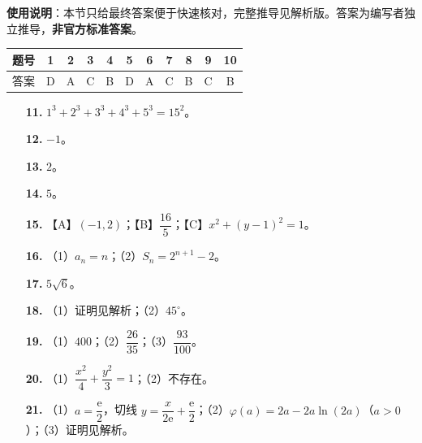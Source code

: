 
\begin{gknotice}
\textbf{使用说明}：本节只给最终答案便于快速核对，完整推导见解析版。答案为编写者独立推导，\textbf{非官方标准答案}。
\end{gknotice}

\begin{center}\begin{tabular}{ccccccccccc}
\toprule
题号 & 1 & 2 & 3 & 4 & 5 & 6 & 7 & 8 & 9 & 10 \\
\midrule
答案 & D & A & C & B & D & A & C & B & C & B \\
\bottomrule
\end{tabular}\end{center}

\begin{itemize}[leftmargin=2.6em]
  \item[\textbf{11.}] $1^3+2^3+3^3+4^3+5^3=15^2$。
  \item[\textbf{12.}] $-1$。
  \item[\textbf{13.}] $2$。
  \item[\textbf{14.}] $5$。
\end{itemize}

\begin{itemize}[leftmargin=2.6em]
  \item[\textbf{15.}] 【A】$(-1,2)$；【B】$\dfrac{16}{5}$；【C】$x^2+(y-1)^2=1$。
\end{itemize}

\begin{itemize}[leftmargin=2.6em]
  \item[\textbf{16.}] （1）$a_n=n$；（2）$S_n=2^{n+1}-2$。
  \item[\textbf{17.}] $5\sqrt6$。
  \item[\textbf{18.}] （1）证明见解析；（2）$45^\circ$。
  \item[\textbf{19.}] （1）$400$；（2）$\dfrac{26}{35}$；（3）$\dfrac{93}{100}$。
  \item[\textbf{20.}] （1）$\dfrac{x^2}{4}+\dfrac{y^2}{3}=1$；（2）不存在。
  \item[\textbf{21.}] （1）$a=\dfrac{\mathrm e}{2}$，切线 $y=\dfrac{x}{2\mathrm e}+\dfrac{\mathrm e}{2}$；（2）$\varphi(a)=2a-2a\ln(2a)$（$a>0$）；（3）证明见解析。
\end{itemize}
